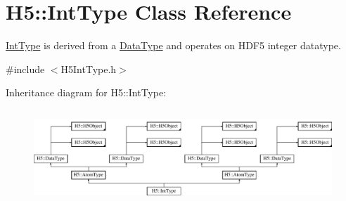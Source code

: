 \hypertarget{class_h5_1_1_int_type}{}\section{H5\+:\+:Int\+Type Class Reference}
\label{class_h5_1_1_int_type}


\hyperlink{class_h5_1_1_int_type}{Int\+Type} is derived from a \hyperlink{class_h5_1_1_data_type}{Data\+Type} and operates on H\+D\+F5 integer datatype.  




{\ttfamily \#include $<$H5\+Int\+Type.\+h$>$}

Inheritance diagram for H5\+:\+:Int\+Type\+:\begin{figure}[H]
\begin{center}
\leavevmode
\includegraphics[height=3.571428cm]{class_h5_1_1_int_type}
\end{center}
\end{figure}
